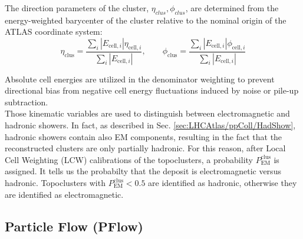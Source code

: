 \noindent The direction parameters of the cluster, $\eta_{clus}, \phi_{clus}$, are determined from the energy-weighted barycenter of the cluster relative to the nominal origin of the ATLAS coordinate system:
\begin{equation}
\eta_{\text{clus}} = \frac{\sum_i |E_{\text{cell}, i}| \eta_{\text{cell}, i}}{\sum_i |E_{\text{cell}, i}|}, \quad \quad \phi_{\text{clus}} = \frac{\sum_i |E_{\text{cell}, i}| \phi_{\text{cell}, i}}{\sum_i |E_{\text{cell}, i}|}
\end{equation}

\noindent Absolute cell energies are utilized in the denominator weighting to prevent directional bias from negative cell energy fluctuations induced by noise or pile-up subtraction.\\
Those kinematic variables are used to distinguish between electromagnetic and hadronic showers. 
In fact, as described in Sec. \ref{sec:LHCAtlas/ppColl/HadShow}, hadronic showers contain also EM components, resulting in the fact that the reconstructed clusters are only partially hadronic.
For this reason, after Local Cell Weighting (LCW) calibrations of the topoclusters, a probability $P_{\text{EM}}^{\text{clus}}$ is assigned.
It tells us the probabilty that the deposit is electromagnetic versus hadronic. 
Topoclusters with $P_{\text{EM}}^{\text{clus}} < 0.5$ are identified as hadronic, otherwise they are identified as electromagnetic.\\

\subsection*{Particle Flow (PFlow)}\label{sec:Reco/Jets/Components/PFlow}

